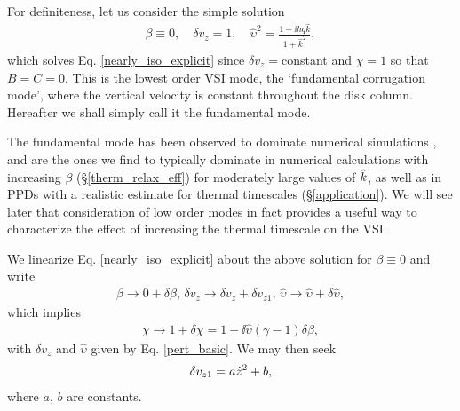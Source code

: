 For definiteness, let us consider the simple solution 
\begin{align}
  \beta\equiv 0, \quad \delta v_z = 1,\quad \hat{\upsilon}^2 = \frac{1 +
  \ii h q \hat{k}}{1+\hat{k}^2}, \label{pert_basic} 
\end{align}
which solves Eq. \ref{nearly_iso_explicit} since $\delta
v_z=$constant and $\chi=1$ so that $B=C=0$. 
This is the lowest order VSI mode, the `fundamental corrugation mode',
where the vertical velocity is constant throughout the disk
column. Hereafter we shall simply call it the fundamental
mode. 

The fundamental mode has been observed to dominate numerical simulations
\citep[]{stoll14}, and are the ones we find to typically 
dominate in numerical calculations with increasing $\beta$
(\S\ref{therm_relax_eff}) for moderately large    
values of $\hat{k}$, as well as in PPDs 
with a realistic estimate for thermal timescales
(\S\ref{application}). We will see later that consideration of low
order modes in fact provides a useful way to characterize the effect
of increasing the thermal timescale on the VSI. 

We linearize Eq. \ref{nearly_iso_explicit} about the above
solution for $\beta\equiv0$ and write 
\begin{align}\label{nearly_iso_pert}
  \beta \to 0 + \delta\beta,\, \delta v_z\to \delta v_z+\delta
  v_{z1},\,\hat{\upsilon} \to \hat{\upsilon} + \delta\hat{\upsilon}, 
\end{align}
which implies 
\begin{align}
  \chi \to 1 + \delta\chi = 1 + \ii \hat{\upsilon}\left(\gamma-1\right)\delta\beta,
\end{align}
with $\delta v_z$ and $\hat{\upsilon}$ given by Eq. \ref{pert_basic}. We
may then seek  
\begin{align}
  \delta v_{z1} = a \hat{z}^2 + b,
\end{align}
where $a$, $b$ are constants. 

